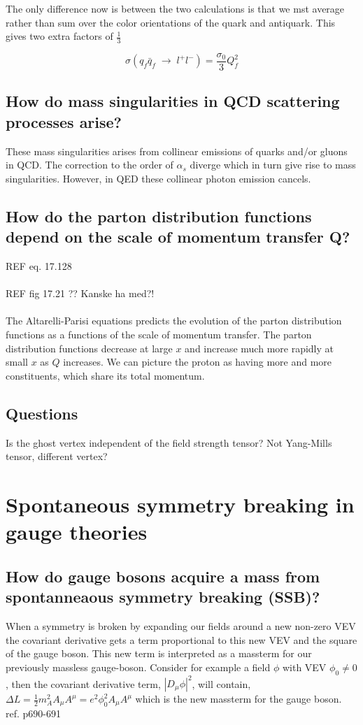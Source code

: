 \documentclass[paper=a4, fontsize=11pt]{scrartcl} %
\numberwithin{equation}{section} %
\numberwithin{figure}{section} %
\numberwithin{table}{section} %
\begin{document}
The only difference now is between the two calculations is that we mst average rather than sum over the color orientations of the quark and antiquark. This gives two extra factors of $\frac{1}{3}$

\begin{equation}
\sigma(q_f\bar{q}_f \; \rightarrow \; l^+l^-) = \frac{\sigma_0}{3}Q_f^2
\end{equation}

\subsection{How do mass singularities in QCD scattering processes arise?}

These mass singularities arises from collinear emissions of quarks and/or gluons in QCD. The correction to the order of $\alpha_s$ diverge which in turn give rise to mass singularities. However, in QED these collinear photon emission cancels.

\subsection{How do the parton distribution functions depend on the scale of momentum transfer Q?}

REF eq. 17.128 \\
\\
REF fig 17.21 ?? Kanske ha med?! \\
\\

The Altarelli-Parisi equations predicts the evolution of the parton distribution functions as a functions of the scale of momentum transfer. The parton distribution functions decrease at large $x$ and increase much more rapidly at small $x$ as $Q$ increases. We can picture the proton as having more and more constituents, which share its total momentum.

\subsection{Questions}
Is the ghost vertex independent of the field strength tensor? Not Yang-Mills tensor, different vertex?

\section{Spontaneous symmetry breaking in gauge theories}


\subsection{How do gauge bosons acquire a mass from spontanneaous symmetry breaking (SSB)?}
When a symmetry is broken by expanding our fields around a new non-zero VEV the covariant derivative gets a term proportional to this new VEV and the square of the gauge boson. This new term is interpreted as a massterm for our previously massless gauge-boson.
Consider for example a field $\phi$ with VEV $\phi_0 \neq 0$, then the covariant derivative term, $|D_{\mu} \phi|^2$, will contain, $\Delta L = \frac{1}{2}m_A^2 A_{\mu}A^{\mu} = e^2 \phi_0^2 A_{\mu}A^{\mu}$ which is the new massterm for the gauge boson.
ref. p690-691
\end{document}
